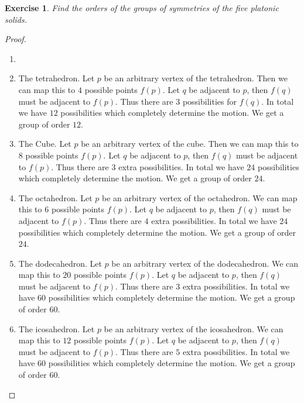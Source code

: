 \documentclass[a4paper, 11pt]{book}
\theoremstyle{plain}
\newtheorem{exercise}[theorem]{Exercise}
\theoremstyle{plain}
\begin{document}
\begin{exercise}
Find the orders of the groups of symmetries of the five platonic solids.
\end{exercise}
\begin{proof}
\begin{enumerate}
    \item[]
    \item The tetrahedron. Let $p$ be an arbitrary vertex of the tetrahedron. Then we can map this to $4$ possible points $f(p)$. Let $q$ be adjacent to $p$, then $f(q)$ must be adjacent to $f(p)$. Thus there are $3$ possibilities for $f(q)$. In total we have $12$ possibilities which completely determine the motion. We get a group of order $12$.

\item The Cube. Let $p$ be an arbitrary vertex of the cube. Then we can map this to $8$ possible points $f(p)$. Let $q$ be adjacent to $p$, then $f(q)$ must be adjacent to $f(p)$. Thus there are $3$ extra possibilities. In total we have $24$ possibilities which completely determine the motion. We get a group of order $24$.

\item The octahedron. Let $p$ be an arbitrary vertex of the octahedron. We can map this to $6$ possible points $f(p)$. Let $q$ be adjacent to $p$, then $f(q)$ must be adjacent to $f(p)$. Thus there are $4$ extra possibilities. In total we have $24$ possibilities which completely determine the motion. We get a group of order $24$.

\item The dodecahedron. Let $p$ be an arbitrary vertex of the dodecahedron. We can map this to $20$ possible points $f(p)$. Let $q$ be adjacent to $p$, then $f(q)$ must be adjacent to $f(p)$. Thus there are $3$ extra possibilities. In total we have $60$ possibilities which completely determine the motion. We get a group of order $60$.

\item The icosahedron. Let $p$ be an arbitrary vertex of the icosahedron. We can map this to $12$ possible points $f(p)$. Let $q$ be adjacent to $p$, then $f(q)$ must be adjacent to $f(p)$. Thus there are $5$ extra possibilities. In total we have $60$ possibilities which completely determine the motion. We get a group of order $60$.
\end{enumerate}
\end{proof}
\end{document}
